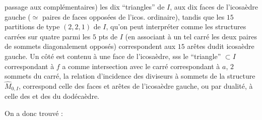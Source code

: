 passage aux complémentaires) les dix ``triangles'' de $I$,  aux dix faces de l'icosaèdre gauche ($\simeq$ paires de faces opposées de l'icos. ordinaire), tandis que les $15$ partitions de type $(2,2,1)$ de $I$, qu'on peut interpréter comme les structures carrées sur quatre parmi les $5$ pts de $I$
(en associant à un tel carré les deux paires de sommets diagonalement opposés) correspondent aux $15$ arêtes dudit icosaèdre gauche.
Un côté  est contenu  à une face  de l'icosaèdre, sss le ``triangle'' $\subset I$ correspondant à $f$ a comme intersection avec le carré correspondant à $a$,   $2$ sommets  du carré, 
 la relation d'incidence des diviseurs à sommets de la structure $\widehat M_{0,I}$, correspond  celle des faces et arêtes de l'icosaèdre gauche, ou par dualité, à celle des  et des  du dodécaèdre.

On a donc trouvé :
